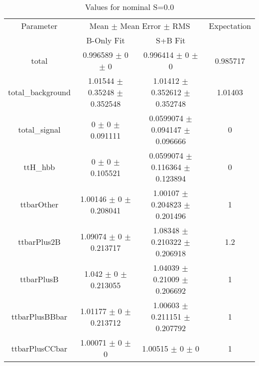 \begin{table}
\centering
\caption{Values for nominal S=0.0}
\begin{tabular}{cccc}
\toprule
Parameter & \multicolumn{2}{c}{Mean $\pm$ Mean Error $\pm$ RMS} & Expectation\\
 & B-Only Fit & S+B Fit & \\
\midrule
total & \num{0.996589} $\pm$ \num{0} $\pm$ \num{0} & \num{0.996414} $\pm$ \num{0} $\pm$ \num{0} & \num{0.985717}\\
total\_background & \num{1.01544} $\pm$ \num{0.35248} $\pm$ \num{0.352548} & \num{1.01412} $\pm$ \num{0.352612} $\pm$ \num{0.352748} & \num{1.01403}\\
total\_signal & \num{0} $\pm$ \num{0} $\pm$ \num{0.091111} & \num{0.0599074} $\pm$ \num{0.094147} $\pm$ \num{0.096666} & \num{0}\\
ttH\_hbb & \num{0} $\pm$ \num{0} $\pm$ \num{0.105521} & \num{0.0599074} $\pm$ \num{0.116364} $\pm$ \num{0.123894} & \num{0}\\
ttbarOther & \num{1.00146} $\pm$ \num{0} $\pm$ \num{0.208041} & \num{1.00107} $\pm$ \num{0.204823} $\pm$ \num{0.201496} & \num{1}\\
ttbarPlus2B & \num{1.09074} $\pm$ \num{0} $\pm$ \num{0.213717} & \num{1.08348} $\pm$ \num{0.210322} $\pm$ \num{0.206918} & \num{1.2}\\
ttbarPlusB & \num{1.042} $\pm$ \num{0} $\pm$ \num{0.213055} & \num{1.04039} $\pm$ \num{0.21009} $\pm$ \num{0.206692} & \num{1}\\
ttbarPlusBBbar & \num{1.01177} $\pm$ \num{0} $\pm$ \num{0.213712} & \num{1.00603} $\pm$ \num{0.211151} $\pm$ \num{0.207792} & \num{1}\\
ttbarPlusCCbar & \num{1.00071} $\pm$ \num{0} $\pm$ \num{0} & \num{1.00515} $\pm$ \num{0} $\pm$ \num{0} & \num{1}\\
\bottomrule
\end{tabular}
\end{table}